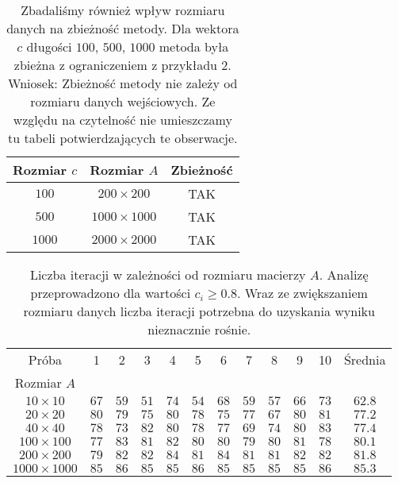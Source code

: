 \documentclass{article}
\begin{document}
	\begin{table}[h]
		\centering
		\begin{tabular}{|c|c|c|}
			\hline
			Rozmiar $c$ & Rozmiar $A$ & Zbieżność \\
			\hline
			$100$ & $200 \times 200$ & TAK \\
			$500$ & $1000 \times 1000$ & TAK \\
			$1000$ & $2000 \times 2000$ & TAK\\
			\hline
		\end{tabular}
		\caption{Zbadaliśmy również wpływ rozmiaru danych na zbieżność metody. Dla wektora $c$ długości $100$, $500$, $1000$ metoda była zbieżna z ograniczeniem z przykładu 2. Wniosek: Zbieżność metody nie zależy od rozmiaru danych wejściowych. Ze względu na czytelność nie umieszczamy tu tabeli potwierdzających te obserwacje.}
	\end{table}

	\begin{table}[h]
		\centering
		\begin{tabular}{|c|c|c|c|c|c|c|c|c|c|c|c|}
			\hline
			Próba & 1 & 2 & 3 & 4 & 5 & 6 & 7 & 8 & 9 & 10 & Średnia \\
			Rozmiar $A$ & & & & & & & & & & & \\
			\hline
			$10 \times 10$ & $67$ & $59$ & $51$ & $74$ & $54$ & $68$ & $59$ & $57$ & $66$ & $73$ & $62.8$ \\
			$20 \times 20$ & $80$ & $79$ & $75$ & $80$ & $78$ & $75$ & $77$ & $67$ & $80$ & $81$ & $77.2$ \\
			$40 \times 40$ & $78$ & $73$ & $82$ & $80$ & $78$ & $77$ & $69$ & $74$ & $80$ & $83$ & $77.4$ \\
			$100 \times 100$ & $77$ & $83$ & $81$ & $82$ & $80$ & $80$ & $79$ & $80$ & $81$ & $78$ & $80.1$ \\
			$200 \times 200$ & $79$ & $82$ & $82$ & $84$ & $81$ & $84$ & $81$ & $81$ & $82$ & $82$ & $81.8$ \\
			$1000 \times 1000$ & $85$ & $86$ & $85$ & $85$ & $86$ & $85$ & $85$ & $85$ & $85$ & $86$ & $85.3$ \\
			\hline
		\end{tabular}
		\caption{Liczba iteracji w zależności od rozmiaru macierzy $A$. Analizę przeprowadzono dla wartości $c_i \ge 0.8$. Wraz ze zwiększaniem rozmiaru danych liczba iteracji potrzebna do uzyskania wyniku nieznacznie rośnie.}
	\end{table}
\end{document}
